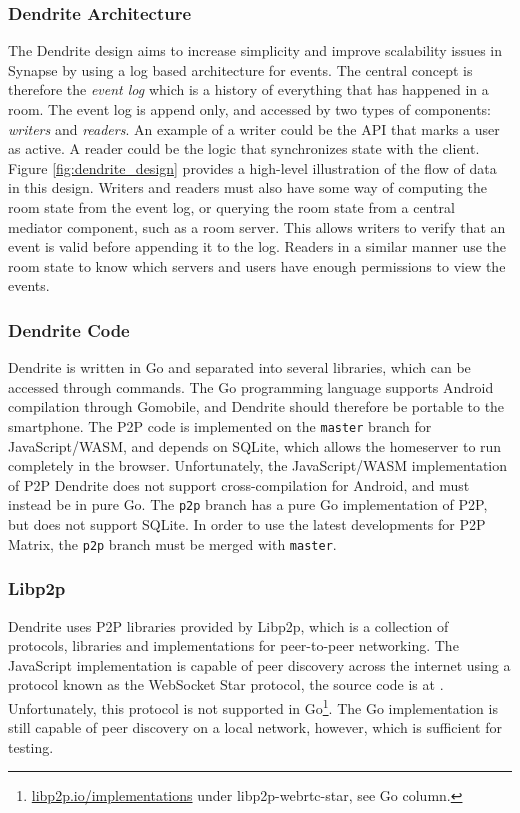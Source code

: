 \subsubsection{Dendrite Architecture}
The Dendrite design aims to increase simplicity and improve scalability issues in Synapse by using a log based architecture for events.
The central concept is therefore the \textit{event log} which is a history of everything that has happened in a room.
The event log is append only, and accessed by two types of components: \textit{writers} and \textit{readers}.
An example of a writer could be the API that marks a user as active.
A reader could be the logic that synchronizes state with the client.
Figure \ref{fig:dendrite_design} provides a high-level illustration of the flow of data in this design.
Writers and readers must also have some way of computing the room state from the event log, or querying the room state from a central mediator component, such as a room server.
This allows writers to verify that an event is valid before appending it to the log.
Readers in a similar manner use the room state to know which servers and users have enough permissions to view the events.

\subsubsection{Dendrite Code}
Dendrite is written in Go\cite{golang_org} and separated into several libraries, which can be accessed through commands.
The Go programming language supports Android compilation through Gomobile\cite{gomobile}, and Dendrite should therefore be portable to the smartphone.
The \ac{P2P} code is implemented on the \texttt{master} branch for JavaScript/WASM, and depends on SQLite, which allows the homeserver to run completely in the browser.
Unfortunately, the JavaScript/WASM implementation of \ac{P2P} Dendrite does not support cross-compilation for Android, and must instead be in pure Go.
The \texttt{p2p} branch has a pure Go implementation of \ac{P2P}, but does not support SQLite.
In order to use the latest developments for \ac{P2P} Matrix, the \texttt{p2p} branch must be merged with \texttt{master}.

\subsubsection{Libp2p}
Dendrite uses \ac{P2P} libraries provided by Libp2p, which is a collection of protocols, libraries and implementations for peer-to-peer networking\cite{libp2p}.
The JavaScript implementation is capable of peer discovery across the internet using a protocol known as the WebSocket Star protocol, the source code is at .
Unfortunately, this protocol is not supported in Go\footnote{
      \url{libp2p.io/implementations} under libp2p-webrtc-star, see Go column.
}.
The Go implementation is still capable of peer discovery on a local network, however, which is sufficient for testing.


